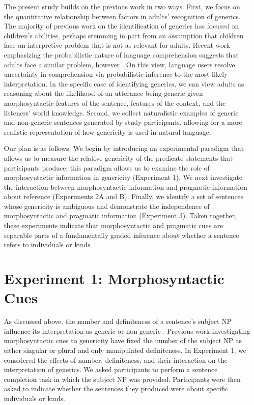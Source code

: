 \documentclass[10pt,letterpaper]{article}
\begin{document}
The present study builds on the previous work in two ways. First, we focus on the quantitative relationship between factors in adults' recognition of generics. The majority of previous work on the identification of generics has focused on children's abilities, perhaps stemming in part from an assumption that children face an interpretive problem that is not as relevant for adults. Recent work emphasizing the probabilistic nature of language comprehension suggests that adults face a similar problem, however \cite{Levy:2008,Frank:2012}. On this view, language users resolve uncertainty in comprehension via probabilistic inference to the most likely interpretation. In the specific case of identifying generics, we can view adults as reasoning about the likelihood of an utterance being generic given morphosyntactic features of the sentence, features of the context, and the listeners' world knowledge. Second, we collect naturalistic examples of generic and non-generic sentences generated by study participants, allowing for a more realistic representation of how genericity is used in natural language. 

Our plan is as follows. We begin by introducing an experimental paradigm that allows us to measure the relative genericity of the predicate statements that participants produce; this paradigm allows us to examine the role of morphosyntactic information in genericity (Experiment 1). We next investigate the interaction between morphosyntactic information and pragmatic information about reference (Experiments 2A and B). Finally, we identify a set of sentences whose genericity is ambiguous and demonstrate the independence of morphosyntactic and pragmatic information (Experiment 3). Taken together, these experiments indicate that morphosyntactic and pragmatic cues are separable parts of a fundamentally graded inference about whether a sentence refers to individuals or kinds. 

\section{Experiment 1: Morphosyntactic Cues}

As discussed above, the number and definiteness of a sentence's subject NP influence its interpretation as generic or non-generic \cite{Carlson:1977,Krifka:1995,Lyons:1977}. Previous work investigating morphosyntactic cues to genericity have fixed the number of the subject NP as either singular \cite{Cimpian:2011} or plural \cite{Gelman:2003} and only manipulated definiteness. In Experiment 1, we considered the effects of number, definiteness, and their interaction on the interpretation of generics. We asked participants to perform a sentence completion task in which the subject NP was provided. Participants were then asked to indicate whether the sentences they produced were about specific individuals or kinds.
\end{document}
